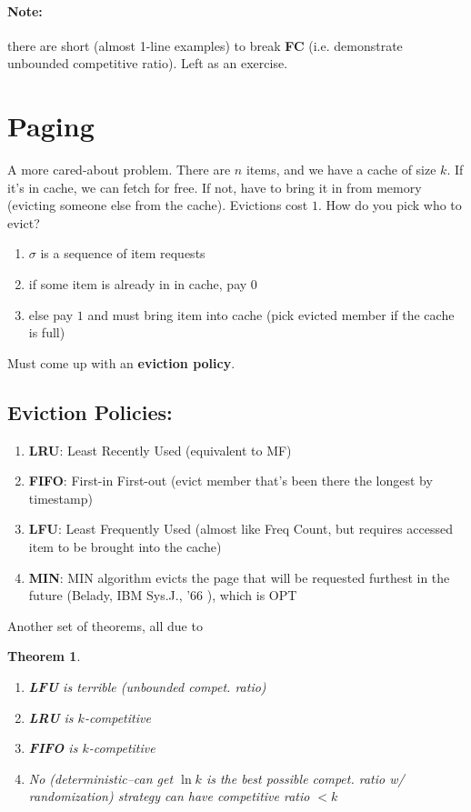 \documentclass[11pt]{article}
\newtheorem{theorem}{Theorem}
\begin{document}
\paragraph{Note:} there are short (almost 1-line examples) to break {\bf FC} (i.e. demonstrate unbounded competitive ratio). Left as an exercise.

\section{Paging}

A more cared-about problem. There are $n$ items, and we have a cache of size $k$. If it's in cache, we can fetch for free. If not, have to bring it in from memory (evicting someone else from the cache). Evictions cost $1$. How do you pick who to evict?

\begin{enumerate}
	\item $\sigma$ is a sequence of item requests
	\item if some item is already in in cache, pay $0$
	\item else pay $1$ and must bring item into cache (pick evicted member if the cache is full)
\end{enumerate}

Must come up with an {\bf eviction policy}.

\subsection{Eviction Policies:}

\begin{enumerate}
	\item {\bf LRU}: Least Recently Used (equivalent to MF)
	\item {\bf FIFO}: First-in First-out (evict member that's been there the longest by timestamp)
	\item {\bf LFU}: Least Frequently Used (almost like Freq Count, but requires accessed item to be brought into the cache)
	\item {\bf MIN}: MIN algorithm evicts the page that will be requested furthest in the future (Belady, IBM Sys.J., '66 \cite{belady66}), which is OPT
\end{enumerate} 

Another set of theorems, all due to \cite{sleat85}

\begin{theorem}
	\begin{enumerate}
		\item {\bf LFU} is terrible (unbounded compet. ratio)
		\item {\bf LRU} is $k$-competitive
		\item {\bf FIFO} is $k$-competitive
		\item No (deterministic--can get $\ln k$ is the best possible compet. ratio w/ randomization) strategy can have competitive ratio $< k$
	\end{enumerate}
\end{theorem}
\end{document}

